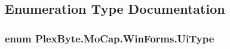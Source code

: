 \subsection{Enumeration Type Documentation}
\subsubsection[{\texorpdfstring{Ui\+Type}{UiType}}]{\setlength{\rightskip}{0pt plus 5cm}enum {\bf Plex\+Byte.\+Mo\+Cap.\+Win\+Forms.\+Ui\+Type}\hspace{0.3cm}{\ttfamily [strong]}}\hypertarget{namespace_plex_byte_1_1_mo_cap_1_1_win_forms_a542bb6f06ab0cb20fe2382da955de892}{}\label{namespace_plex_byte_1_1_mo_cap_1_1_win_forms_a542bb6f06ab0cb20fe2382da955de892}
